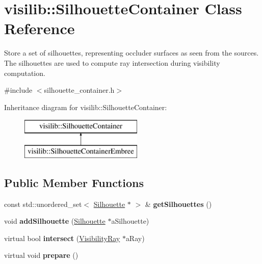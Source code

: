 \hypertarget{classvisilib_1_1_silhouette_container}{}\section{visilib\+::Silhouette\+Container Class Reference}
\label{classvisilib_1_1_silhouette_container}


Store a set of silhouettes, representing occluder surfaces as seen from the sources. The silhouettes are used to compute ray intersection during visibility computation. 




{\ttfamily \#include $<$silhouette\+\_\+container.\+h$>$}

Inheritance diagram for visilib\+::Silhouette\+Container\+:\begin{figure}[H]
\begin{center}
\leavevmode
\includegraphics[height=2.000000cm]{classvisilib_1_1_silhouette_container}
\end{center}
\end{figure}
\subsection*{Public Member Functions}
\begin{DoxyCompactItemize}
\item 
\mbox{\label{classvisilib_1_1_silhouette_container_a7c42eff193b69bd62532c1b723700901}} 
const std\+::unordered\+\_\+set$<$ \mbox{\hyperlink{classvisilib_1_1_silhouette}{Silhouette}} $\ast$ $>$ \& {\bfseries get\+Silhouettes} ()
\item 
\mbox{\label{classvisilib_1_1_silhouette_container_a5a9047d08292878caf0d4cea6107122f}} 
void {\bfseries add\+Silhouette} (\mbox{\hyperlink{classvisilib_1_1_silhouette}{Silhouette}} $\ast$a\+Silhouette)
\item 
\mbox{\label{classvisilib_1_1_silhouette_container_a680d7185898724a3dbebcc8268a51b80}} 
virtual bool {\bfseries intersect} (\mbox{\hyperlink{structvisilib_1_1_visibility_ray}{Visibility\+Ray}} $\ast$a\+Ray)
\item 
\mbox{\label{classvisilib_1_1_silhouette_container_a83c0a6a3517e09446d8f145a3f58eda7}} 
virtual void {\bfseries prepare} ()
\end{DoxyCompactItemize}
